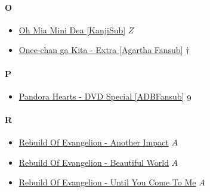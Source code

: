 		\paragraph{O} \hypertarget{SPO}{}
			\begin{itemize}
			
				\item  \href{https://mega.nz/#F!pYAGhBwL!ZRePhRNV2s8GhGtEYFsT7Q} {Oh Mia Mini Dea [KanjiSub]} $Z$   \\ 
				\item  \href{https://mega.nz/#!OTQDgYLZ!2nYU9yeTfVu8_fwy3mkrvvE720mrhkotM6r2S2vOpUc} {Onee-chan ga Kita - Extra [Agartha Fansub]} $\dag$   \\ 
			
			\end{itemize}
		
		\paragraph{P} \hypertarget{SPP}{}
			\begin{itemize}
				
				\item  \href{https://mega.nz/#F!TWRHVA7Y!gzI-e2V2ke-BKP2OfBAgrQ} {Pandora Hearts - DVD Special [ADBFansub]} $\oldstylenums{9}$   \\ 
				
			\end{itemize}
		
		\paragraph{R} \hypertarget{SPR}{}
			\begin{itemize}
			
				\item  \href{https://mega.nz/#!D0pRRYpZ!EkiZ0g20ra3Q3245uiOQypFyk-hn4X-JOXX8yZZWlwI} {Rebuild Of Evangelion - Another Impact} $A$   \\ 
				\item  \href{https://mega.nz/#!2opzmAjD!JSNNA8W59jLZV6ui65rJ5SVFTgxm5_LSKGRAP0Jqp0Q} {Rebuild Of Evangelion - Beautiful World} $A$   \\ 
				\item  \href{https://mega.nz/#!3gx0TDrB!gILXfmS44m5WTGtJD17Di1cBVJtABMV_lAbBg8N5rWc} {Rebuild Of Evangelion - Until You Come To Me} $A$   \\ 
			
			\end{itemize}
		
